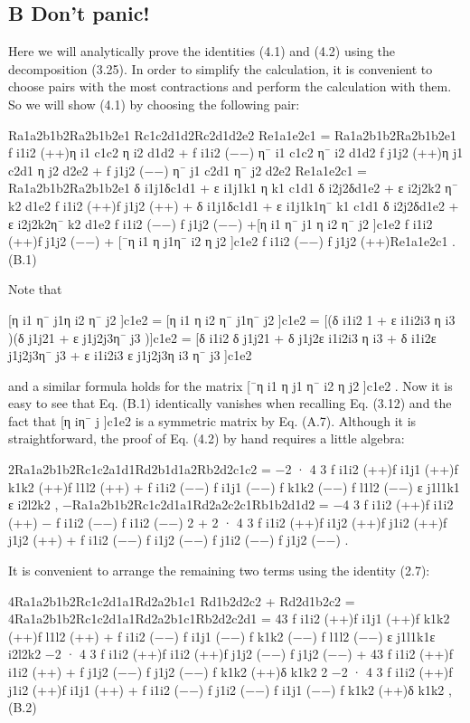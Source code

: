 \documentclass{article}
\begin{document}
\subsection{B Don't panic!}

Here we will analytically prove the identities (4.1) and (4.2) using the decomposition (3.25). In order to simplify the calculation, it is convenient to choose pairs with the most contractions and perform the calculation with them. So we will show (4.1) by choosing the following pair:

Ra1a2b1b2Ra2b1b2e1 Rc1c2d1d2Rc2d1d2e2 Re1a1e2c1 = Ra1a2b1b2Ra2b1b2e1 f i1i2 (++)η i1 c1c2 η i2 d1d2 + f i1i2 (−−) η¯ i1 c1c2 η¯ i2 d1d2 f j1j2 (++)η j1 c2d1 η j2 d2e2 + f j1j2 (−−) η¯ j1 c2d1 η¯ j2 d2e2 Re1a1e2c1 = Ra1a2b1b2Ra2b1b2e1 δ i1j1δc1d1 + ε i1j1k1 η k1 c1d1 δ i2j2δd1e2 + ε i2j2k2 η¯ k2 d1e2 f i1i2 (++)f j1j2 (++) + δ i1j1δc1d1 + ε i1j1k1η¯ k1 c1d1 δ i2j2δd1e2 + ε i2j2k2η¯ k2 d1e2 f i1i2 (−−) f j1j2 (−−) +[η i1 η¯ j1 η i2 η¯ j2 ]c1e2 f i1i2 (++)f j1j2 (−−) + [¯η i1 η j1η¯ i2 η j2 ]c1e2 f i1i2 (−−) f j1j2 (++)Re1a1e2c1 . (B.1)

Note that

[η i1 η¯ j1η i2 η¯ j2 ]c1e2 = [η i1 η i2 η¯ j1η¯ j2 ]c1e2 = [(δ i1i2 1 + ε i1i2i3 η i3 )(δ j1j21 + ε j1j2j3η¯ j3 )]c1e2 = [δ i1i2 δ j1j21 + δ j1j2ε i1i2i3 η i3 + δ i1i2ε j1j2j3η¯ j3 + ε i1i2i3 ε j1j2j3η i3 η¯ j3 ]c1e2

and a similar formula holds for the matrix [¯η i1 η j1 η¯ i2 η j2 ]c1e2 . Now it is easy to see that Eq. (B.1) identically vanishes when recalling Eq. (3.12) and the fact that [η iη¯ j ]c1e2 is a symmetric matrix by Eq. (A.7). Although it is straightforward, the proof of Eq. (4.2) by hand requires a little algebra:

2Ra1a2b1b2Rc1c2a1d1Rd2b1d1a2Rb2d2c1c2 = −2 · 4 3 f i1i2 (++)f i1j1 (++)f k1k2 (++)f l1l2 (++) + f i1i2 (−−) f i1j1 (−−) f k1k2 (−−) f l1l2 (−−) ε j1l1k1 ε i2l2k2 , −Ra1a2b1b2Rc1c2d1a1Rd2a2c2c1Rb1b2d1d2 = −4 3 f i1i2 (++)f i1i2 (++) − f i1i2 (−−) f i1i2 (−−) 2 + 2 · 4 3 f i1i2 (++)f i1j2 (++)f j1i2 (++)f j1j2 (++) + f i1i2 (−−) f i1j2 (−−) f j1i2 (−−) f j1j2 (−−) .

It is convenient to arrange the remaining two terms using the identity (2.7):

4Ra1a2b1b2Rc1c2d1a1Rd2a2b1c1 Rd1b2d2c2 + Rd2d1b2c2 = 4Ra1a2b1b2Rc1c2d1a1Rd2a2b1c1Rb2d2c2d1 = 43 f i1i2 (++)f i1j1 (++)f k1k2 (++)f l1l2 (++) + f i1i2 (−−) f i1j1 (−−) f k1k2 (−−) f l1l2 (−−) ε j1l1k1ε i2l2k2 −2 · 4 3 f i1i2 (++)f i1i2 (++)f j1j2 (−−) f j1j2 (−−) + 43 f i1i2 (++)f i1i2 (++) + f j1j2 (−−) f j1j2 (−−) f k1k2 (++)δ k1k2 2 −2 · 4 3 f i1i2 (++)f j1i2 (++)f i1j1 (++) + f i1i2 (−−) f j1i2 (−−) f i1j1 (−−) f k1k2 (++)δ k1k2 , (B.2)
\end{document}
